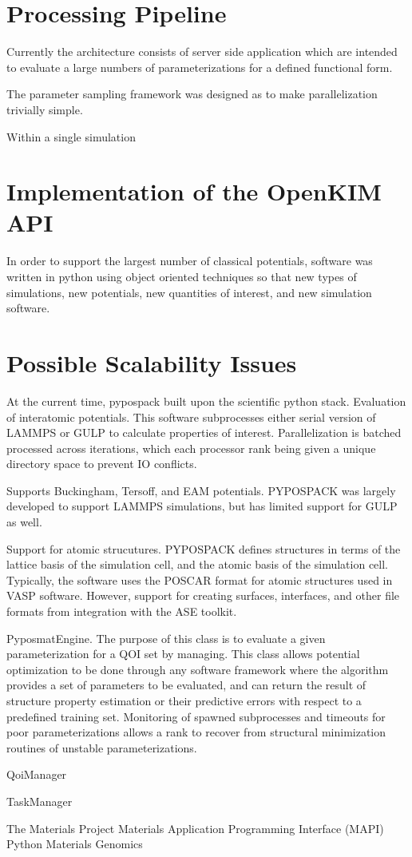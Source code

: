 \section{Processing Pipeline}
Currently the architecture consists of server side application which are intended to evaluate a large numbers of parameterizations for a defined functional form.

The parameter sampling framework was designed as to make parallelization trivially simple.

Within a single simulation

\section{Implementation of the OpenKIM API}

In order to support the largest number of classical potentials, software was written in python using object oriented techniques so that new types of simulations, new potentials, new quantities of interest, and new simulation software.

\section{Possible Scalability Issues}

At the current time, pypospack built upon the scientific python stack.
Evaluation of interatomic potentials.  This software subprocesses either serial version of LAMMPS or GULP to calculate properties of interest.  Parallelization is batched processed across iterations, which each processor rank being given a unique directory space to prevent IO conflicts.

Supports Buckingham, Tersoff, and EAM potentials.  PYPOSPACK was largely developed to support LAMMPS simulations, but has limited support for GULP as well.

Support for atomic strucutures.  PYPOSPACK defines structures in terms of the lattice basis of the simulation cell, and the atomic basis of the simulation cell.  Typically, the software uses the POSCAR format for atomic structures used in VASP software.  However, support for creating surfaces, interfaces, and other file formats from integration with the ASE toolkit.

PyposmatEngine.  The purpose of this class is to evaluate a given parameterization for a QOI set by managing.  This class allows potential optimization to be done through any software framework where the algorithm provides a set of parameters to be evaluated, and can return the result of structure property estimation or their predictive errors with respect to a predefined training set.  Monitoring of spawned subprocesses and timeouts for poor parameterizations allows a rank to recover from structural minimization routines of unstable parameterizations.

QoiManager

TaskManager


The Materials Project\cite{Jain2013_materialsproject}
Materials Application Programming Interface (MAPI) \cite{ong2015_mapi}
Python Materials Genomics\cite{ong2013_pymatgen}
